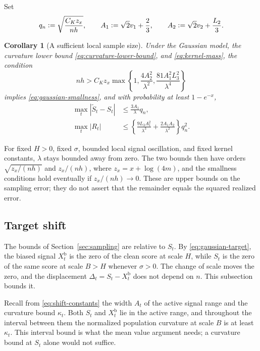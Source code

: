 \documentclass[11pt]{article}
\newcommand{\eqdef}{\mathrel{\vcentcolon=}}
\newcommand{\BiasedSignal}{X^{\mathrm b}}
\newcommand{\IMFs}{S}
\newcommand{\IMFt}{\widetilde S}
\newtheorem{corollary}[proposition]{Corollary}
\theoremstyle{definition}
\begin{document}
Set
\begin{equation}
  q_n\eqdef\sqrt{\frac{C_Kz_x}{nh}},\qquad
  A_1\eqdef\sqrt2v_1+\frac23,\qquad
  A_2\eqdef\sqrt2v_2+\frac{L_2}{3}.
  \label{eq:rate-constants}
\end{equation}

\begin{corollary}[A sufficient local sample size]\label{cor:sample-size}
Under the Gaussian model, the curvature lower bound
\eqref{eq:curvature-lower-bound}, and \eqref{eq:kernel-mass}, the condition
\begin{equation}
  nh>C_Kz_x\max\left\{
       1,\frac{4A_2^2}{\lambda^2},
       \frac{81A_1^2L_3^2}{\lambda^4}\right\}
  \label{eq:sample-size-condition}
\end{equation}
implies \eqref{eq:gaussian-smallness}, and with probability at least
\(1-e^{-x}\),
\begin{align}
  \max_t|\IMFt_t-\IMFs_t|
    &\leq\frac{3A_1}{\lambda}q_n,
      \label{eq:raw-rate}\\
  \max_t|R_t|
    &\leq\left\{\frac{9L_3A_1^2}{\lambda^3}
                 +\frac{2A_1A_2}{\lambda^2}\right\}q_n^2.
      \label{eq:remainder-rate}
\end{align}
\end{corollary}

For fixed \(H>0\), fixed \(\sigma\), bounded local signal oscillation, and
fixed kernel constants, \(\lambda\) stays bounded away from zero.  The two
bounds then have orders \(\sqrt{z_x/(nh)}\) and \(z_x/(nh)\), where
\(z_x=x+\log(4m)\), and the smallness conditions hold eventually if
\(z_x/(nh)\to0\).  These are upper bounds on the sampling error; they do not
assert that the remainder equals the squared realized error.

\subsection{Target shift}\label{sec:shift}

The bounds of Section~\ref{sec:sampling} are relative to \(\IMFs_t\).  By
\eqref{eq:gaussian-target}, the biased signal \(\BiasedSignal_t\) is the zero
of the clean score at scale \(H\), while \(\IMFs_t\) is the zero of the same
score at scale \(B>H\) whenever \(\sigma>0\).  The change of scale moves the
zero, and the displacement \(\Delta_t=\IMFs_t-\BiasedSignal_t\) does not
depend on \(n\).  This subsection bounds it.

Recall from \eqref{eq:shift-constants} the width \(A_t\) of the active signal
range and the curvature bound \(\kappa_t\).  Both \(\IMFs_t\) and
\(\BiasedSignal_t\) lie in the active range, and throughout the interval
between them the normalized population curvature at scale \(B\) is at least
\(\kappa_t\).  This interval bound is what the mean value argument needs; a
curvature bound at \(\IMFs_t\) alone would not suffice.
\end{document}
